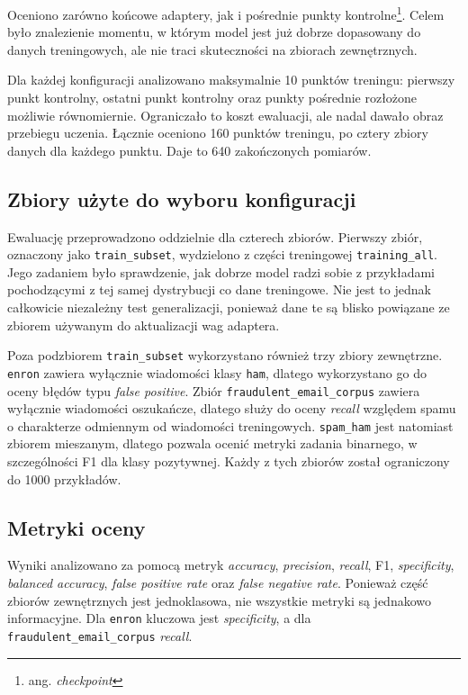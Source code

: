 Oceniono zarówno końcowe adaptery, jak i pośrednie punkty
kontrolne\footnote{ang. \emph{checkpoint}}. Celem było znalezienie momentu, w
którym model jest już dobrze dopasowany do danych treningowych, ale nie traci
skuteczności na zbiorach zewnętrznych.

Dla każdej konfiguracji analizowano maksymalnie 10 punktów treningu:
pierwszy punkt kontrolny, ostatni punkt kontrolny oraz punkty pośrednie rozłożone możliwie
równomiernie. Ograniczało to koszt ewaluacji, ale nadal dawało obraz przebiegu
uczenia. Łącznie oceniono 160
punktów treningu, po cztery zbiory danych dla każdego punktu. Daje to 640
zakończonych pomiarów.

\subsection{Zbiory użyte do wyboru konfiguracji}

Ewaluację przeprowadzono oddzielnie dla czterech zbiorów. Pierwszy zbiór,
oznaczony jako \texttt{train\_subset}, wydzielono z części treningowej
\texttt{training\_all}. Jego zadaniem było sprawdzenie, jak dobrze model radzi
sobie z przykładami pochodzącymi z tej samej dystrybucji co dane treningowe.
Nie jest to jednak całkowicie niezależny test generalizacji, ponieważ dane te są blisko
powiązane ze zbiorem używanym do aktualizacji wag adaptera.

Poza podzbiorem \texttt{train\_subset} wykorzystano również trzy zbiory
zewnętrzne.
\texttt{enron} zawiera wyłącznie wiadomości klasy \texttt{ham}, dlatego wykorzystano go do
oceny błędów typu \emph{false positive}. Zbiór \texttt{fraudulent\_email\_corpus}
zawiera wyłącznie wiadomości oszukańcze, dlatego służy do oceny \emph{recall}
względem spamu o charakterze odmiennym od wiadomości treningowych.
\texttt{spam\_ham} jest natomiast zbiorem mieszanym, dlatego pozwala ocenić
metryki zadania binarnego, w szczególności F1 dla klasy pozytywnej. Każdy z
tych zbiorów został ograniczony do 1000 przykładów.

\subsection{Metryki oceny}

Wyniki analizowano za pomocą metryk \emph{accuracy}, \emph{precision},
\emph{recall}, F1, \emph{specificity}, \emph{balanced accuracy},
\emph{false positive rate} oraz \emph{false negative rate}. Ponieważ część
zbiorów zewnętrznych jest jednoklasowa, nie wszystkie metryki są jednakowo
informacyjne. Dla \texttt{enron} kluczowa jest \emph{specificity}, a dla
\texttt{fraudulent\_email\_corpus} \emph{recall}.

